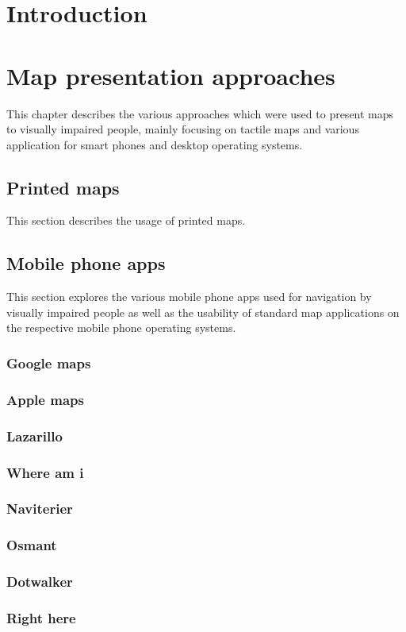 \documentclass[nolof,digital]{fithesis3}
\begin{document}
\chapter{Introduction}
\chapter{Map presentation approaches}
This chapter describes the various approaches which were used to present maps to visually impaired people, mainly focusing on tactile maps and various application for smart phones and desktop operating systems.
\section{Printed maps}
This section describes the usage of printed maps.
\section{Mobile phone apps}
This section explores the various mobile phone apps used for navigation by visually impaired people as well as the usability of standard map applications on the respective mobile phone operating systems.
\subsection{Google maps}
\subsection{Apple maps}
\subsection{Lazarillo}
\subsection{Where am i}
\subsection{Naviterier}
\subsection{Osmant}
\subsection{Dotwalker}
\subsection{Right here}
\end{document}
